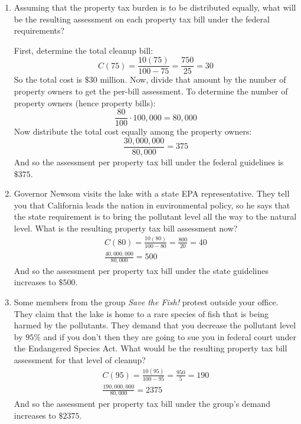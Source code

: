 \documentclass[letterpaper,12pt,fleqn]{article}
\begin{document}
\begin{enumerate}[label={(\alph*)}]
\item Assuming that the property tax burden is to be distributed equally, what will be the resulting assessment on
  each property tax bill under the federal requirements?

  \bigskip

  First, determine the total cleanup bill:
  \[C(75)=\frac{10(75)}{100-75}=\frac{750}{25}=30\]
  So the total cost is \(\$30\) million.  Now, divide that amount by the number of property owners to get the per-bill
  assessment.  To determine the number of property owners (hence property bills):
  \[\frac{80}{100}\cdot100,000=80,000\]
  Now distribute the total cost equally among the property owners:
  \[\frac{30,000,000}{80,000}=375\]
  And so the assessment per property tax bill under the federal guidelines is \(\$375\).

  \bigskip

\item Governor Newsom visits the lake with a state EPA representative.  They tell you that California leads the
  nation in environmental policy, so he says that the state requirement is to bring the pollutant level all the way
  to the natural level.  What is the resulting property tax bill assessment now?
  \begin{gather*}
    C(80)=\frac{10(80)}{100-80}=\frac{800}{20}=40 \\
    \frac{40,000,000}{80,000}=500
  \end{gather*}
  And so the assessment per property tax bill under the state guidelines increases to \(\$500\).

  \bigskip

\item Some members from the group \emph{Save the Fish!} protest outside your office.  They claim that the lake is
  home to a rare species of fish that is being harmed by the pollutants.  They demand that you decrease the
  pollutant level by \(95\%\) and if you don't then they are going to sue you in federal court under the Endangered
  Species Act.  What would be the resulting property tax bill assessment for that level of cleanup?
  \begin{gather*}
    C(95)=\frac{10(95)}{100-95}=\frac{950}{5}=190 \\
    \frac{190,000,000}{80,000}=2375
  \end{gather*}
  And so the assessment per property tax bill under the group's demand increases to \(\$2375\).


\end{enumerate}
\end{document}
